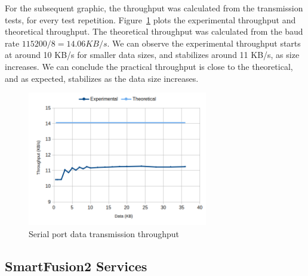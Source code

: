 For the subsequent graphic, the throughput was calculated from the transmission tests, for every test repetition.
Figure~\ref{fig:comms:tput} plots the experimental throughput and theoretical throughput. The theoretical throughput was calculated from the baud rate \(115200/8 = 14.06 KB/s\).
We can observe the experimental throughput starts at around 10 KB/s for smaller data sizes, and stabilizes around 11 KB/s, as size increases.
We can conclude the practical throughput is close to the theoretical, and as expected, stabilizes as the data size increases.

\begin{figure}[h!]
	\centering
	\includegraphics[width=0.7\textwidth]{./Images/comms-tput.png}
	\caption{Serial port data transmission throughput}
	\label{fig:comms:tput}
\end{figure}

\subsection{SmartFusion2 Services}\label{chap:evaluation:board}

